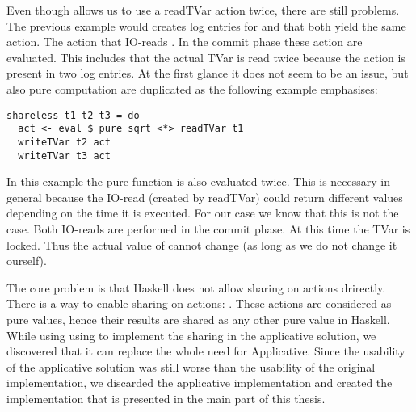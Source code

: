 Even though  allows us to use a readTVar action twice, there are still problems. The previous example
would creates log entries for  and  that both yield the same  action. The  
action that IO-reads . In the commit phase these action are evaluated. This includes that the actual 
TVar is read twice because the action is present in two log entries. At the first glance it does not seem to
be an issue, but also pure computation are duplicated as the following example emphasises:
\begin{lstlisting}
shareless t1 t2 t3 = do 
  act <- eval $ pure sqrt <*> readTVar t1
  writeTVar t2 act
  writeTVar t3 act
\end{lstlisting}
In this example the pure function  is also evaluated twice. This is necessary in general because the 
IO-read (created by readTVar) could return different values depending on the time it is executed. For our case
we know that this is not the case. Both IO-reads are performed in the commit phase. At this time the TVar  is 
locked. Thus the actual value of  cannot change (as long as we do not change it ourself). 

The core problem is that Haskell does not allow sharing on  actions drirectly. There is a way to enable 
sharing on  actions: . These actions are considered as pure values, 
hence their results are shared as any other pure value in Haskell. While using using 
to implement the sharing in the applicative solution, we discovered that it can replace the whole need for 
Applicative. Since the usability of the applicative solution was still worse than the usability of the 
original implementation, we discarded the applicative implementation and created the implementation that
is presented in the main part of this thesis.


